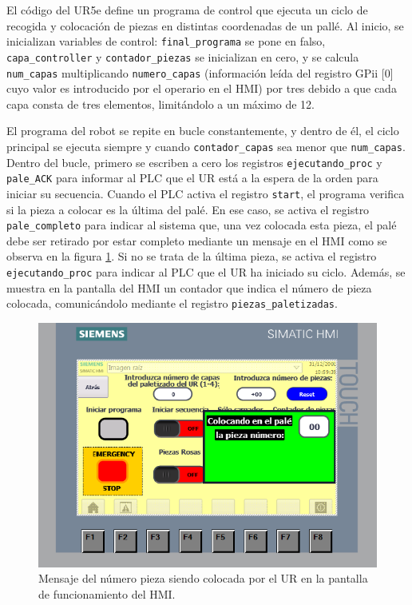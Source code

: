 \FloatBarrier

El código del UR5e define un programa de control que ejecuta un ciclo de recogida y colocación de piezas en distintas coordenadas de un pallé. Al inicio, se inicializan variables de control: \texttt{final\_programa} se pone en falso, \texttt{capa\_controller} y \texttt{contador\_piezas} se inicializan en cero, y se calcula \texttt{num\_capas} multiplicando \texttt{numero\_capas} (información leída del registro GPii [0] cuyo valor es introducido por el operario en el HMI) por tres debido a que cada capa consta de tres elementos, limitándolo a un máximo de 12.

El programa del robot se repite en bucle constantemente, y dentro de él, el ciclo principal se ejecuta siempre y cuando \texttt{contador\_capas} sea menor que \texttt{num\_capas}. Dentro del bucle, primero se escriben a cero los registros \texttt{ejecutando\_proc} y \texttt{pale\_ACK} para informar al PLC que el UR está a la espera de la orden para iniciar su secuencia. Cuando el PLC activa el registro \texttt{start}, el programa verifica si la pieza a colocar es la última del palé. En ese caso, se activa el registro \texttt{pale\_completo} para indicar al sistema que, una vez colocada esta pieza, el palé debe ser retirado por estar completo mediante un mensaje en el HMI como se observa en la figura \ref{fig:HMI_funcionamiento_UR}. Si no se trata de la última pieza, se activa el registro \texttt{ejecutando\_proc} para indicar al PLC que el UR ha iniciado su ciclo. Además, se muestra en la pantalla del HMI un contador que indica el número de pieza colocada, comunicándolo mediante el registro \texttt{piezas\_paletizadas}.

\begin{figure}[h!]
  \begin{center}
  	\includegraphics[width=12cm]{figs/HMI_funcionamiento_UR}
  \end{center}
  \caption{\centering Mensaje del número pieza siendo colocada por el UR en la pantalla de funcionamiento del HMI.}
  \label{fig:HMI_funcionamiento_UR}
\end{figure}

